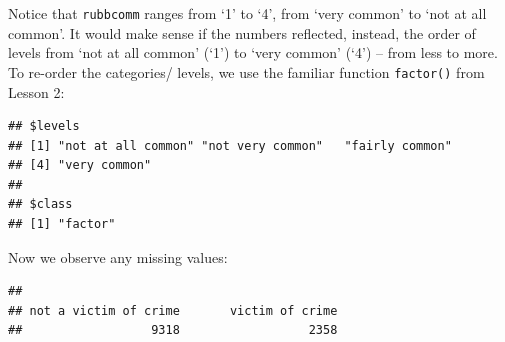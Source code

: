 \documentclass[
]{book}
\newenvironment{Shaded}{\begin{snugshade}}{\end{snugshade}}
\newcommand{\AttributeTok}[1]{\textcolor[rgb]{0.77,0.63,0.00}{#1}}
\newcommand{\CommentTok}[1]{\textcolor[rgb]{0.56,0.35,0.01}{\textit{#1}}}
\newcommand{\FunctionTok}[1]{\textcolor[rgb]{0.00,0.00,0.00}{#1}}
\newcommand{\NormalTok}[1]{#1}
\newcommand{\OtherTok}[1]{\textcolor[rgb]{0.56,0.35,0.01}{#1}}
\newcommand{\SpecialCharTok}[1]{\textcolor[rgb]{0.00,0.00,0.00}{#1}}
\newcommand{\StringTok}[1]{\textcolor[rgb]{0.31,0.60,0.02}{#1}}
\begin{document}
Notice that \texttt{rubbcomm} ranges from `1' to `4', from `very common' to `not at all common'. It would make sense if the numbers reflected, instead, the order of levels from `not at all common' (`1') to `very common' (`4') -- from less to more. To re-order the categories/ levels, we use the familiar function \texttt{factor()} from Lesson 2:

\begin{Shaded}
\end{Shaded}

\begin{verbatim}
## $levels
## [1] "not at all common" "not very common"   "fairly common"    
## [4] "very common"      
## 
## $class
## [1] "factor"
\end{verbatim}

Now we observe any missing values:

\begin{Shaded}
\end{Shaded}

\begin{verbatim}
## 
## not a victim of crime       victim of crime 
##                  9318                  2358
\end{verbatim}
\end{document}
